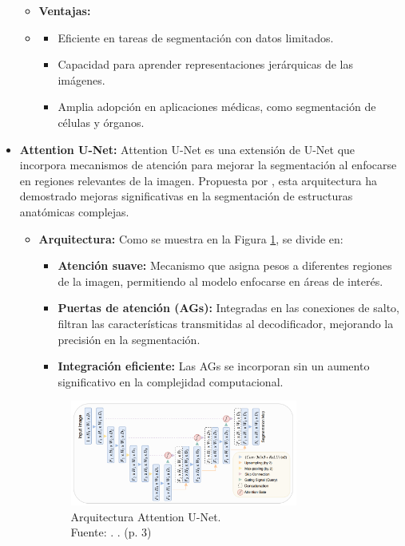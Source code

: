 \begin{itemize}
\begin{itemize}
\item \textbf{Ventajas:} 
\item 
\begin{itemize} 
\item Eficiente en tareas de segmentación con datos limitados. \parencite{ronneberger2015}
\item Capacidad para aprender representaciones jerárquicas de las imágenes. \parencite{ronneberger2015}
\item Amplia adopción en aplicaciones médicas, como segmentación de células y órganos. \parencite{ronneberger2015}
\end{itemize}

\end{itemize}


    \item \textbf{Attention U-Net:} Attention U-Net es una extensión de U-Net que incorpora mecanismos de atención para mejorar la segmentación al enfocarse en regiones relevantes de la imagen. Propuesta por \cite{oktay2018attentionunet}, esta arquitectura ha demostrado mejoras significativas en la segmentación de estructuras anatómicas complejas. 

	\begin{itemize} 
\item \textbf{Arquitectura:} Como se muestra en la Figura \ref{2:unetat}, se divide en:
\begin{itemize} 
\item \textbf{Atención suave:}  Mecanismo que asigna pesos a diferentes regiones de la imagen, permitiendo al modelo enfocarse en áreas de interés. \parencite{oktay2018attentionunet}
\item \textbf{Puertas de atención (AGs):} Integradas en las conexiones de salto, filtran las características transmitidas al decodificador, mejorando la precisión en la segmentación. \parencite{oktay2018attentionunet}
\item \textbf{Integración eficiente:} Las AGs se incorporan sin un aumento significativo en la complejidad computacional. \parencite{oktay2018attentionunet}
\end{itemize}

\begin{figure}[H]
		\begin{center}
			\includegraphics[width=0.75\textwidth]{2/figures/arqunetat.png}
			\caption[Arquitectura Attention U-Net]{Arquitectura Attention U-Net.\\
			Fuente: \cite{oktay2018attentionunet}. . (p. 3)}
			\label{2:unetat}
		\end{center}
	\end{figure}


\end{itemize}
\end{itemize}
